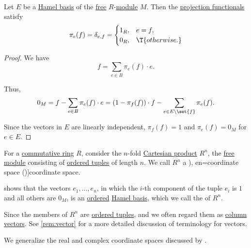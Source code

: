 \begin{proposition}\label{thm:basis_projection_orthonormal}
  Let \( E \) be a \hyperref[def:hamel_basis]{Hamel basis} of the \hyperref[def:free_semimodule]{free} \( R \)-\hyperref[def:module]{module} \( M \). Then the \hyperref[def:basis_decomposition]{projection functionals} satisfy
  \begin{equation*}
    \pi_e(f) = \delta_{e,f} = \begin{cases}
      1_R, &e = f, \\
      0_R, &\T{otherwise.}
    \end{cases}
  \end{equation*}
\end{proposition}
\begin{proof}
  We have
  \begin{equation*}
    f = \sum_{e \in B} \pi_e(f) \cdot e.
  \end{equation*}

  Thus,
  \begin{equation*}
    0_M = f - \sum_{e \in B} \pi_e(f) \cdot e = (1 - \pi_f(f)) \cdot f - \sum_{e \in E \setminus \set{ f }} \pi_e(f).
  \end{equation*}

  Since the vectors in \( E \) are linearly independent, \( \pi_f(f) = 1 \) and \( \pi_e(f) = 0_M \) for \( e \in E \).
\end{proof}

\begin{definition}\label{def:coordinate_space}\mimprovised
  For a \hyperref[def:ring/commutative]{commutative ring} \( R \), consider the \( n \)-fold \hyperref[def:cartesian_product]{Cartesian product} \( R^n \), the \hyperref[def:free_semimodule]{free module} consisting of \hyperref[def:ordered_tuple]{ordered tuples} of length \( n \). We call \( R^n \) a \term[ru=координатное пространство (\cite[443]{ИльинСадовничийСендов1985АнализТом1}), en=coordinate space (\cite[4]{Halmos1974VectorSpaces})]{coordinate space}.

   shows that the vectors \( e_1, \ldots, e_n \), in which the \( i \)-th component of the tuple \( e_i \) is \( 1 \) and all others are \( 0_M \), is an \hyperref[def:ordered_hamel_basis]{ordered} \hyperref[def:hamel_basis]{Hamel basis}, which we call the  of \( R^n \).
\end{definition}
\begin{comments}
  \item Since the members of \( R^n \) are \hyperref[def:ordered_tuple]{ordered tuples}, and we often regard them as \hyperref[def:array/column_vector]{column vectors}. See \cref{rem:vector} for a more detailed discussion of terminology for vectors.

  \item We generalize the real and complex coordinate spaces discussed by \textcite[4; 5]{Halmos1974VectorSpaces}.
\end{comments}

